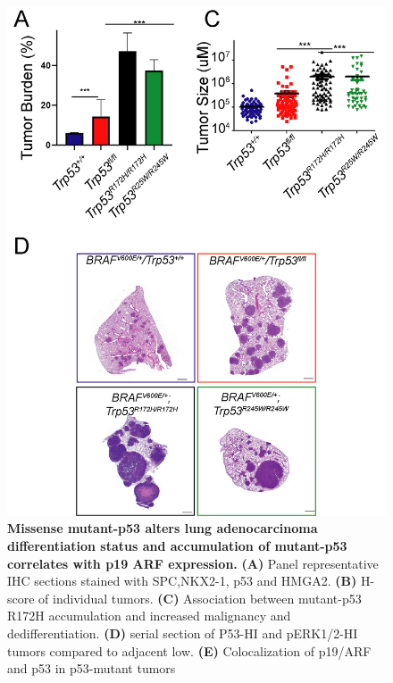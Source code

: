 \begin{figure}
\hypertarget{fig:12}{%
\centering
\includegraphics[width=1\textwidth,height=\textheight]{images/p53_2.png}
\caption{\textbf{Missense mutant-p53 alters lung adenocarcinoma differentiation status and accumulation of mutant-p53 correlates with p19 ARF expression.} \textbf{(A)} Panel representative IHC sections stained with SPC,NKX2-1, p53 and HMGA2. \textbf{(B)} H-score of individual tumors. \textbf{(C)} Association between mutant-p53 R172H accumulation and increased malignancy and dedifferentiation. \textbf{(D)} serial section of P53-HI and pERK1/2-HI tumors compared to adjacent low. \textbf{(E)} Colocalization of p19/ARF and p53 in p53-mutant tumors}\label{fig:12}
}
\end{figure}

